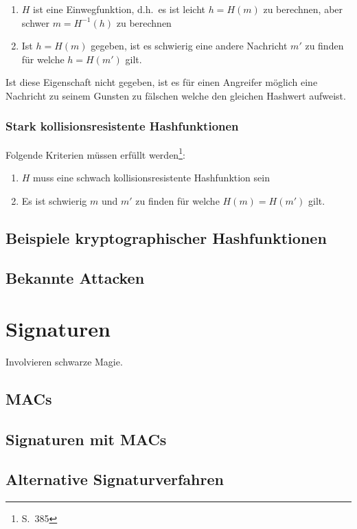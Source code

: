 \begin{enumerate}
\item $H$ ist eine Einwegfunktion, d.h.~es ist leicht $h = H(m)$ zu
  berechnen, aber schwer $m = H^{-1}(h)$ zu berechnen
\item Ist $h = H(m)$ gegeben, ist es schwierig eine andere Nachricht
  $m'$ zu finden für welche $h = H(m')$ gilt.
\end{enumerate}

Ist diese Eigenschaft nicht gegeben, ist es für einen Angreifer
möglich eine Nachricht zu seinem Gunsten zu fälschen welche den
gleichen Hashwert aufweist.

\subsection{Stark kollisionsresistente Hashfunktionen}

Folgende Kriterien müssen erfüllt werden\footnote{S.~385}:

\begin{enumerate}
\item $H$ muss eine schwach kollisionsresistente Hashfunktion sein
\item Es ist schwierig $m$ und $m'$ zu finden für welche $H(m) =
  H(m')$ gilt.
\end{enumerate}

\section{Beispiele kryptographischer Hashfunktionen}

\section{Bekannte Attacken}

\author{Autor: Vasilij Schneidermann}
\chapter{Signaturen}

Involvieren schwarze Magie.

\section{\ac{MAC}s}

\section{Signaturen mit \ac{MAC}s}

\section{Alternative Signaturverfahren}
